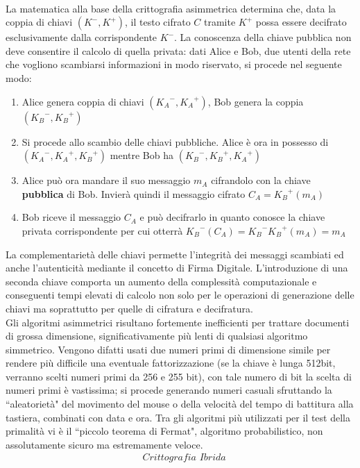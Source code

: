 \documentclass[a4paper,12pt]{tesiinfo}
\begin{document}
\\
La matematica alla base della crittografia asimmetrica determina che, data la coppia di chiavi $(K^-, K^+)$, il testo cifrato $C$ tramite $K^+$ possa essere decifrato esclusivamente dalla corrispondente $K^-$. La conoscenza della chiave pubblica non deve consentire il calcolo di quella privata: dati Alice e Bob, due utenti della rete che vogliono scambiarsi informazioni in modo riservato, si procede nel seguente modo:
\begin{enumerate}
  \item Alice genera coppia di chiavi $({K_A}^-, {K_A}^+)$, Bob genera la coppia $({K_B}^-, {K_B}^+)$
  \item Si procede allo scambio delle chiavi pubbliche. Alice \`e ora in possesso di $({K_A}^-, {K_A}^+, {K_B}^+)$ mentre Bob ha $({K_B}^-, {K_B}^+, {K_A}^+)$
  \item Alice pu\`o ora mandare il suo messaggio $m_A$ cifrandolo con la chiave \textbf{pubblica} di Bob. Invier\`a quindi il messaggio cifrato $C_A = {K_B}^+(m_A)$
  \item Bob riceve il messaggio $C_A$ e pu\`o decifrarlo in quanto conosce la chiave privata corrispondente per cui otterr\`a ${K_B}^-(C_A) = {K_B}^-{K_B}^+(m_A) = m_A$
\end{enumerate}
La complementariet\`a delle chiavi permette l'integrit\`a dei messaggi scambiati ed anche l'autenticit\`a mediante il concetto di Firma Digitale. L'introduzione di una seconda chiave comporta un aumento della complessit\`a computazionale e conseguenti tempi elevati di calcolo non solo per le operazioni di generazione delle chiavi ma soprattutto per quelle di cifratura e decifratura.
\\
Gli algoritmi asimmetrici risultano fortemente inefficienti per trattare documenti di grossa dimensione, significativamente pi\`u lenti di qualsiasi algoritmo simmetrico. Vengono difatti usati due numeri primi di dimensione simile per rendere pi\`u difficile una eventuale fattorizzazione (se la chiave \`e lunga 512bit, verranno scelti numeri primi da 256 e 255 bit), con tale numero di bit la scelta di numeri primi \`e vastissima; si procede generando numeri casuali sfruttando la ``aleatoriet\`a" del movimento del mouse o della velocit\`a del tempo di battitura alla tastiera, combinati con data e ora. Tra gli algoritmi pi\`u utilizzati per il test della primalit\`a vi \`e il ``piccolo teorema di Fermat", algoritmo probabilistico, non assolutamente sicuro ma estremamente veloce. 
\\
\begin{align*}
&\textit{Crittografia Ibrida}
\end{align*}
\end{document}

